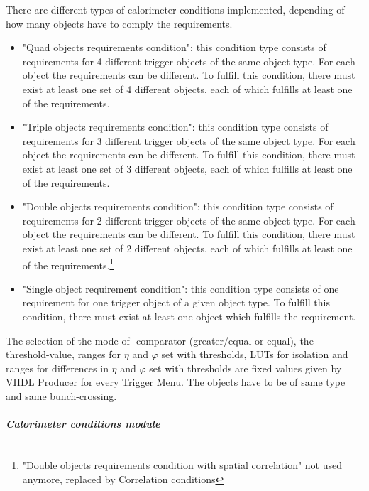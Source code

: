 There are different types of calorimeter conditions implemented, depending of how many objects have to comply the requirements.
\begin{itemize}
\item "Quad objects requirements condition": this condition type consists of requirements for 4 different trigger objects of the same object type. 
For each object the requirements can be different. To fulfill this condition, there must exist at least one set of 4 different objects,
each of which fulfills at least one of the requirements.
\item "Triple objects requirements condition": this condition type consists of requirements for 3 different trigger objects of the same object type. 
For each object the requirements can be different. To fulfill this condition, there must exist at least one set of 3 different objects,
each of which fulfills at least one of the requirements.
\item "Double objects requirements condition": this condition type consists of requirements for 2 different trigger objects of the same object type. 
For each object the requirements can be different. To fulfill this condition, there must exist at least one set of 2 different objects,
each of which fulfills at least one of the requirements.\footnote{"Double objects requirements condition with spatial correlation" not used anymore, replaced by Correlation conditions}
\item "Single object requirement condition": this condition type consists of one requirement for one trigger object of a given object type. 
To fulfill this condition, there must exist at least one object which fulfills the requirement.

\end{itemize}

The selection of the mode of \et-comparator (greater/equal or equal), the \et-threshold-value, ranges for $\eta$ and $\varphi$ set with thresholds, LUTs for isolation and ranges for differences in $\eta$ and $\varphi$ set with thresholds are fixed values given by VHDL Producer for every Trigger Menu.
The objects have to be of same type and same bunch-crossing.

\subparagraph{Calorimeter conditions module}
\label{sec:gtl:calo_conditions_module}

